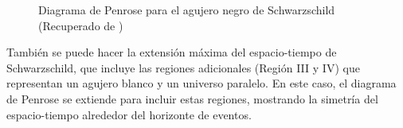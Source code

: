 \begin{figure}[H]
  \caption{Diagrama de Penrose para el agujero negro de Schwarzschild (Recuperado de \cite{neutelings-2024})}
\end{figure}
También se puede hacer la extensión máxima del espacio-tiempo de Schwarzschild, que incluye las regiones adicionales (Región III y IV) que representan un agujero blanco y un universo paralelo. En este caso, el diagrama de Penrose se extiende para incluir estas regiones, mostrando la simetría del espacio-tiempo alrededor del horizonte de eventos.


